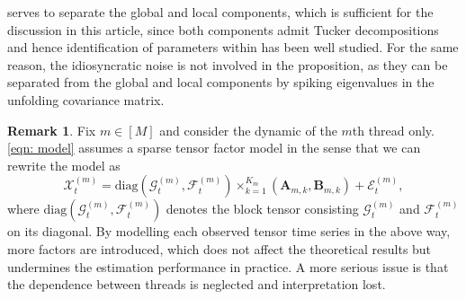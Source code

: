 \documentclass[aos]{imsart}
\theoremstyle{plain}
\theoremstyle{definition}
\newtheorem{remark}{Remark}
\def\cE{\mathcal{E}}
\def\cF{\mathcal{F}}
\def\cG{\mathcal{G}} \def\cH{\boldsymbol{\mathcal{H}}} \def\cI{\mathcal{I}}
\def\cX{\mathcal{X}}
\def\bA{\mathbf{A}}
\def\bB{\mathbf{B}}
\def\diag{\mathrm{diag}}
\begin{document}
 serves to separate the global and local components, which is sufficient for the discussion in this article, since both components admit Tucker decompositions and hence identification of parameters within has been well studied. For the same reason, the idiosyncratic noise is not involved in the proposition, as they can be separated from the global and local components by spiking eigenvalues in the unfolding covariance matrix.



\begin{remark}
Fix $m\in[M]$ and consider the dynamic of the $m$th thread only. \eqref{eqn: model} assumes a sparse tensor factor model in the sense that we can rewrite the model as
\begin{equation}
\label{eqn: Xt_rewrite_tfm}
\cX_t^{(m)} = \diag(\cG_t^{(m)}, \cF_t^{(m)}) \times_{k=1}^{K_m} (\bA_{m,k}, \bB_{m,k}) + \cE_t^{(m)} ,
\end{equation}
where $\diag(\cG_t^{(m)}, \cF_t^{(m)})$ denotes the block tensor consisting $\cG_t^{(m)}$ and $\cF_t^{(m)}$ on its diagonal. By modelling each observed tensor time series in the above way, more factors are introduced, which does not affect the theoretical results but undermines the estimation performance in practice. A more serious issue is that the dependence between threads is neglected and interpretation lost.
\end{remark}
\end{document}
